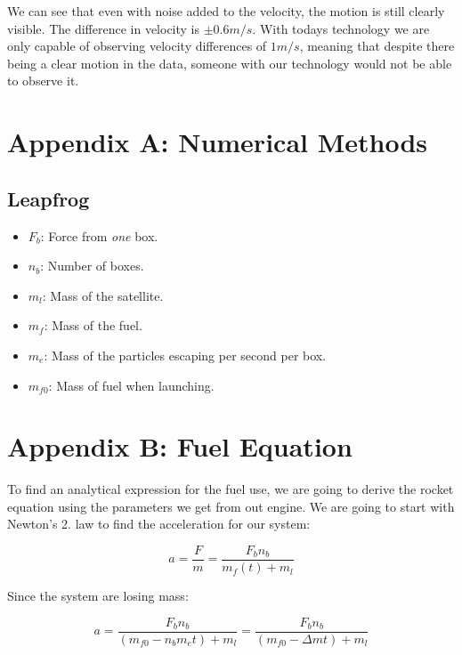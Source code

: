 \documentclass[a4paper, 10pt]{article}
\begin{document}
We can see that even with noise added to the velocity, the motion is still clearly visible. The difference in velocity is $\pm 0.6 m/s$. With todays technology we are only capable of observing velocity differences of $1 m/s$, meaning that despite there being a clear motion in the data, someone with our technology would not be able to observe it.
















\section{Appendix A: Numerical Methods}
\subsection{Leapfrog}\label{sec:leap}

 
\begin{itemize}
\item $F_b$: Force from \textit{one} box.
\item $n_b$: Number of boxes.
\item $m_l$: Mass of the satellite.
\item $m_f$: Mass of the fuel.
\item $m_e$: Mass of the particles escaping per second per box.
\item $m_{f0}$: Mass of fuel when launching.
\end{itemize}

\section{Appendix B: Fuel Equation}\label{sec:Fuel}

To find an analytical expression for the fuel use, we are going to derive the rocket equation using the parameters we get from out engine. We are going to start with Newton's 2. law to find the acceleration for our system:

\begin{equation}
a = \frac{F}{m} = \frac{F_b n_b}{m_f(t) + m_l} 
\end{equation}

Since the system are losing mass:

\begin{equation}
a = \frac{F_b n_b}{(m_{f0} - n_b m_e t) + m_l} = \frac{F_b n_b}{(m_{f0} - \Delta m t) + m_l}
\end{equation} 
\end{document}
